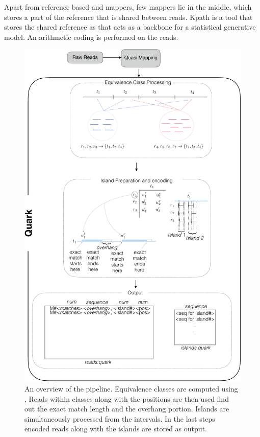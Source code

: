 Apart from reference based and \denovo mappers, few mappers lie in the middle, which  stores a part of the reference that is shared between reads. Kpath \citep{Kingsford2015} is a tool that stores the shared reference as that acts as a backbone for a statistical generative model. An arithmetic coding is performed on the reads.

\begin{figure}[!ht]
\includegraphics[width=\textwidth]{Figures/quark_overview4-crop}
\centering
\caption{\label{fig:overview}An overview of the \quark pipeline. Equivalence classes are computed using \qm, Reads within classes along with the positions are then used find out the exact match length and the overhang portion. Islands are simultaneously processed from the intervals. In the last steps encoded reads along with the islands are stored as \quark output.}
\end{figure}

